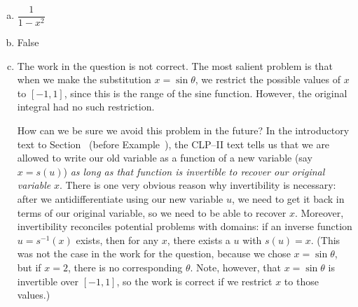 \begin{answer}

\begin{enumerate}[(a)]
\item $\dfrac{1}{1-x^2}$
\item False
\item The work in the question is not correct. The most salient problem is that when we make the substitution $x=\sin\theta$, we restrict the possible values of $x$ to $[-1,1]$, since this is the range of the sine function. However, the original integral had no such restriction.

How can we be sure we avoid this problem in the future? In the introductory text to Section~ (before Example~), the
CLP--II text tells us that we are allowed to write our old variable as a function of a new variable (say $x=s(u)$) \emph{as long as that function is invertible to recover our original variable} $x$. There is one very obvious reason why invertibility is necessary: after we antidifferentiate using our new variable $u$, we need to get it back in terms of our original variable, so we need to be able to recover $x$. Moreover, invertibility  reconciles  potential problems with domains: if an inverse function $u=s^{-1}(x)$ exists, then for any $x$, there exists a $u$ with $s(u)=x$. (This was not the case in the work for the question, because we chose $x=\sin \theta$, but if $x=2$, there is no corresponding $\theta$. Note, however, that $x=\sin\theta$ is invertible over $[-1,1]$,  so the work is correct if we restrict $x$ to those values.)

\end{enumerate}

\end{answer}
